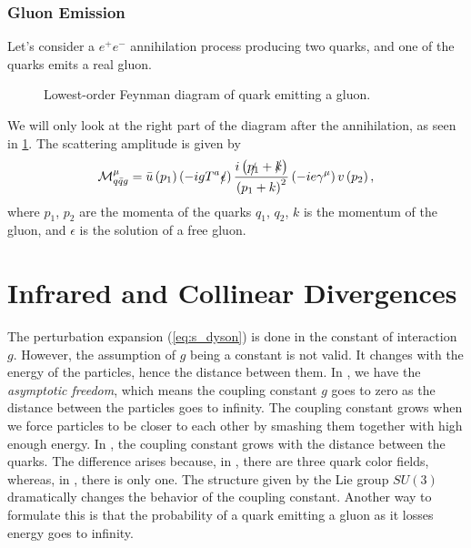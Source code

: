 \subsubsection*{Gluon Emission}
Let's consider a $e^+e^-$ annihilation process producing two quarks, and one of the quarks emits a real gluon.
\begin{figure}[htb]
        \centering
    \caption{Lowest-order Feynman diagram of quark emitting a gluon.}
    \label{fig:qg_emission}
\end{figure}
We will only look at the right part of the diagram after the annihilation, as seen in \cref{fig:qg_emission}.
The scattering amplitude is given by \cite{qcd}
\begin{equation}
    \label{eq:g_emission}
    \mathcal{M}_{q \bar{q} g}^\mu=\bar{u}\left(p_1\right)\left(-i g T^a \slashed{\epsilon} \right) \frac{i\left(\slashed{p_1} +\slashed{k}\right)}{\left(p_1+k\right)^2}\left(-i e \gamma^\mu\right) v\left(p_2\right) ,
\end{equation}
where $p_1$, $p_2$ are the momenta of the quarks $q_1$, $q_2$, $k$ is the momentum of the gluon, and $\epsilon$ is the solution of a free gluon.



\section{Infrared and Collinear Divergences}
\label{sec:IR_div}
The perturbation expansion (\ref{eq:s_dyson}) is done in the constant of interaction $g$. 
However, the assumption of $g$ being a constant is not valid.
It changes with the energy of the particles, hence the distance between them. 
In \QED, we have the \emph{asymptotic freedom}, which means the coupling constant $g$ goes to zero as the distance between the particles goes to infinity.
The coupling constant grows when we force particles to be closer to each other by smashing them together with high enough energy.
In \QCD, the coupling constant grows with the distance between the quarks.
The difference arises because, in \QCD, there are three quark color fields, whereas, in \QED, there is only one.
The structure given by the Lie group $SU(3)$ dramatically changes the behavior of the coupling constant.
Another way to formulate this is that the probability of a quark emitting a gluon as it losses energy goes to infinity.

